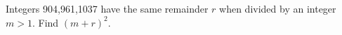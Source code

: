 Integers 904,961,1037 have the same remainder $r$ when divided by an integer $m>1$. Find $(m+r)^2$.
